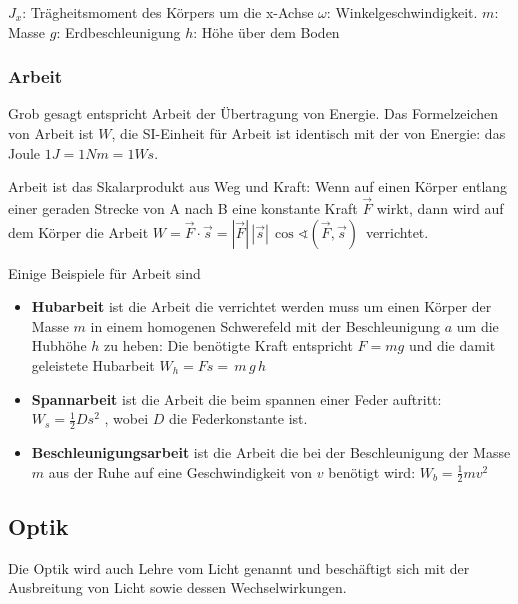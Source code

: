 \documentclass[../document.tex]{subfiles}
\begin{document}
$J_x$: Trägheitsmoment des Körpers um die x-Achse\newline
$\omega$: Winkelgeschwindigkeit.\newline
$m$: Masse\newline
$g$: Erdbeschleunigung\newline
$h$: Höhe über dem Boden

\subsubsection{Arbeit}
Grob gesagt entspricht Arbeit der Übertragung von Energie. Das Formelzeichen von Arbeit ist $W$, die SI-Einheit für Arbeit ist identisch mit der von Energie: das Joule $1 J = 1 Nm = 1 Ws$. 

Arbeit ist das Skalarprodukt aus Weg und Kraft: Wenn auf einen Körper entlang einer geraden Strecke von A nach B eine konstante Kraft $\vec F$ wirkt, dann wird auf dem Körper die Arbeit
$W={\vec  F}\cdot {\vec  s}=|{\vec  F}|\,|{\vec  s}|\,\cos \sphericalangle \left({\vec  F},{\vec  s}\right)\,$ verrichtet.

Einige Beispiele für Arbeit sind
\begin{itemize}
	\item \textbf{Hubarbeit} ist die Arbeit die verrichtet werden muss um einen Körper der Masse $m$ in einem homogenen Schwerefeld mit der Beschleunigung $a$ um die Hubhöhe $h$ zu heben: Die benötigte Kraft entspricht $F = mg$ und die damit geleistete Hubarbeit $W_h = Fs = \,m\,g\,h$ 
	\item \textbf{Spannarbeit} ist die Arbeit die beim spannen einer Feder auftritt: $W_s = \frac {1}{2} D s^2$ , wobei $D$ die Federkonstante ist.
	\item \textbf{Beschleunigungsarbeit} ist die Arbeit die bei der Beschleunigung der Masse $m$ aus der Ruhe auf eine Geschwindigkeit von $v$ benötigt wird: $W_b = \frac{1}{2} m v^2$
\end{itemize}
\subsection{Optik}

Die Optik wird auch Lehre vom Licht genannt und beschäftigt sich mit der Ausbreitung von Licht sowie dessen Wechselwirkungen. 
\end{document}
